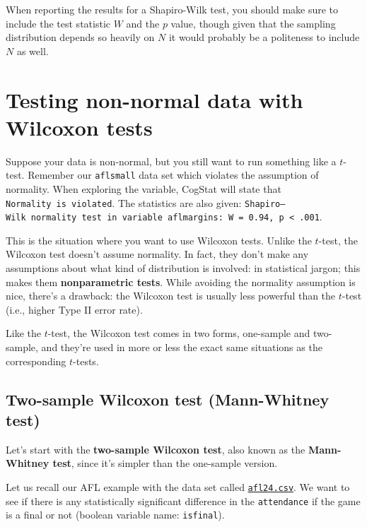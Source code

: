 \documentclass[
]{book}
\theoremstyle{definition}
\theoremstyle{definition}
\theoremstyle{definition}
\theoremstyle{definition}
\theoremstyle{remark}
\begin{document}
When reporting the results for a Shapiro-Wilk test, you should make sure to include the test statistic \(W\) and the \(p\) value, though given that the sampling distribution depends so heavily on \(N\) it would probably be a politeness to include \(N\) as well.

\hypertarget{wilcox}{%
\section{Testing non-normal data with Wilcoxon tests}\label{wilcox}}

Suppose your data is non-normal, but you still want to run something like a \(t\)-test. Remember our \texttt{aflsmall} data set which violates the assumption of normality. When exploring the variable, CogStat will state that \texttt{Normality\ is\ violated}. The statistics are also given: \texttt{Shapiro–Wilk\ normality\ test\ in\ variable\ aflmargins:\ W\ =\ 0.94,\ p\ \textless{}\ .001}.

This is the situation where you want to use Wilcoxon tests. Unlike the \(t\)-test, the Wilcoxon test doesn't assume normality. In fact, they don't make any assumptions about what kind of distribution is involved: in statistical jargon; this makes them \textbf{nonparametric tests}. While avoiding the normality assumption is nice, there's a drawback: the Wilcoxon test is usually less powerful than the \(t\)-test (i.e., higher Type II error rate).

Like the \(t\)-test, the Wilcoxon test comes in two forms, one-sample and two-sample, and they're used in more or less the exact same situations as the corresponding \(t\)-tests.

\hypertarget{mannwhitney}{%
\subsection{Two-sample Wilcoxon test (Mann-Whitney test)}\label{mannwhitney}}

Let's start with the \textbf{two-sample Wilcoxon test}, also known as the \textbf{Mann-Whitney test}, since it's simpler than the one-sample version.

Let us recall our AFL example with the data set called \href{resources/data/afl24.csv}{\texttt{afl24.csv}}. We want to see if there is any statistically significant difference in the \texttt{attendance} if the game is a final or not (boolean variable name: \texttt{isfinal}).
\end{document}
